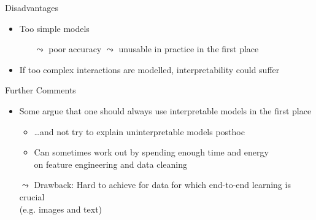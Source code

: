 \documentclass[aspectratio=169]{../latex_main/tntbeamer}  %
\begin{document}
\begin{frame}[c]{Disadvantages}

    \begin{itemize}
        \item Too simple models
        \begin{itemize}
            \item[$\leadsto$] poor accuracy $\leadsto$ unusable in practice in the first place
        \end{itemize}
        \pause
        \medskip
        \item If too complex interactions are modelled, interpretability could suffer
    \end{itemize}	
	
\end{frame}

\begin{frame}[c]{Further Comments}

    \begin{itemize}
        \item Some argue that one should always use interpretable models in the first place 
        \begin{itemize}
            \item \ldots and not try to explain uninterpretable models posthoc
            \item Can sometimes work out by spending enough time and energy\\ on feature engineering and data cleaning
        \end{itemize}
        \item[$\leadsto$] Drawback: Hard to achieve for data for which end-to-end learning is crucial\\ (e.g. images and text)
    \end{itemize}	
	
\end{frame}

	
\end{document}
